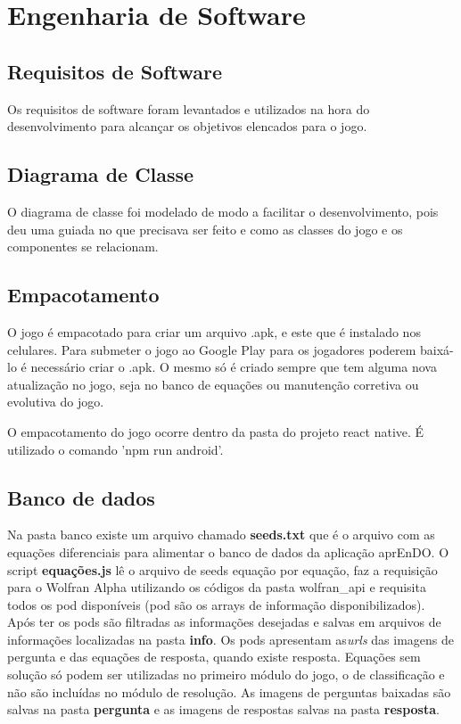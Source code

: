 \chapter[Engenharia de Software]{Engenharia de Software}

\section[Requisitos de Software]{Requisitos de Software}
Os requisitos de software foram levantados e utilizados na hora do desenvolvimento para alcançar os objetivos elencados para o jogo. 

\section[Diagrama de Classe]{Diagrama de Classe}
O diagrama de classe foi modelado de modo a facilitar o desenvolvimento, pois deu uma guiada no que precisava ser feito e como as classes do jogo e os componentes se relacionam. 

\section[Empacotamento]{Empacotamento}
O jogo é empacotado para criar um arquivo .apk, e este que é instalado nos celulares. Para submeter o jogo ao Google Play para os jogadores poderem baixá-lo é necessário criar o .apk. O mesmo só é criado sempre que tem alguma nova atualização no jogo, seja no banco de equações ou manutenção corretiva ou evolutiva do jogo.

O empacotamento do jogo ocorre dentro da pasta do projeto react native. É utilizado o comando 'npm run android'.

\section[Banco de dados]{Banco de dados} 
Na pasta banco existe um arquivo chamado \textbf{seeds.txt} que é o arquivo com as equações diferenciais para alimentar o banco de dados da aplicação aprEnDO. O script \textbf{equações.js} lê o arquivo de seeds equação por equação, faz a requisição para o Wolfran Alpha utilizando os códigos da pasta wolfran\_api e requisita todos os pod disponíveis (pod são os arrays de informação disponibilizados). Após ter os pods são filtradas as informações desejadas e salvas em arquivos de informações localizadas na pasta \textbf{info}. Os pods apresentam as\textit{urls} das imagens de pergunta e das equações de resposta, quando existe resposta. Equações sem solução só podem ser utilizadas no primeiro módulo do jogo, o de classificação e não são incluídas no módulo de resolução. As imagens de perguntas baixadas são salvas na pasta \textbf{pergunta} e as imagens de respostas salvas na pasta \textbf{resposta}.

